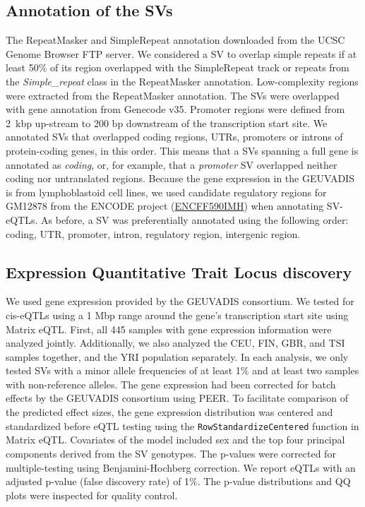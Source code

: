\documentclass[11pt]{ucscthesis}
\begin{document}
\subsection{Annotation of the SVs}

The RepeatMasker and SimpleRepeat annotation downloaded from the UCSC Genome Browser FTP server.
We considered a SV to overlap simple repeats if at least 50\% of its region overlapped with the SimpleRepeat track or repeats from the {\it Simple\_repeat} class in the RepeatMasker annotation.
Low-complexity regions were extracted from the RepeatMasker annotation.
The SVs were overlapped with gene annotation from Genecode v35.
Promoter regions were defined from 2~kbp up-stream to 200 bp downstream of the transcription start site.
We annotated SVs that overlapped coding regions, UTRs, promoters or introns of protein-coding genes, in this order.
This means that a SVs spanning a full gene is annotated as {\it coding}, or, for example, that a {\it promoter} SV overlapped neither coding nor untranslated regions.
Because the gene expression in the GEUVADIS is from lymphoblastoid cell lines, we used candidate regulatory regions for GM12878 from the ENCODE project\cite{encode1,encode2} (\href{https://www.encodeproject.org/files/ENCFF590IMH/}{ENCFF590IMH}) when annotating SV-eQTLs.
As before, a SV was preferentially annotated using the following order: coding, UTR, promoter, intron, regulatory region, intergenic region.



\subsection{Expression Quantitative Trait Locus discovery}
\label{subsec:aim2:eqtldiscovery}

We used gene expression provided by the GEUVADIS consortium\cite{geuvadis_2013}.
We tested for cis-eQTLs using a 1 Mbp range around the gene's transcription start site using Matrix eQTL\cite{matrix_eqtl_2012}.
First, all 445 samples with gene expression information were analyzed jointly.
Additionally, we also analyzed the CEU, FIN, GBR, and TSI samples together, and the YRI population separately.
In each analysis, we only tested SVs with a minor allele frequencies of at least 1\% and at least two samples with non-reference alleles.
The gene expression had been corrected for batch effects by the GEUVADIS consortium using PEER\cite{geuvadis_2013}.
To facilitate comparison of the predicted effect sizes, the gene expression distribution was centered and standardized before eQTL testing using the \verb!RowStandardizeCentered! function in Matrix eQTL.
Covariates of the model included sex and the top four principal components derived from the SV genotypes.
The p-values were corrected for multiple-testing using Benjamini-Hochberg correction.
We report eQTLs with an adjusted p-value (false discovery rate) of 1\%.
The p-value distributions and QQ plots were inspected for quality control.
\end{document}
